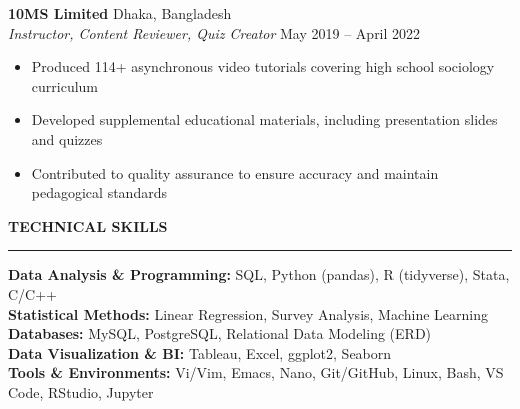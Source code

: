 \documentclass[letterpaper, 11pt]{article}
\begin{document}

    \noindent \textbf{10MS Limited} \hfill Dhaka, Bangladesh \\
    \textit{Instructor, Content Reviewer, Quiz Creator} \hfill May 2019 -- April 2022
    \begin{itemize}[noitemsep, topsep=4pt, itemsep=2pt]
        \item Produced 114+ asynchronous video tutorials covering high school sociology curriculum
        \item Developed supplemental educational materials, including presentation slides and quizzes
        \item Contributed to quality assurance to ensure accuracy and maintain pedagogical standards
    \end{itemize}
    \vspace{0.5em}

    \noindent \textbf{\large TECHNICAL SKILLS}
    \vspace{0.3em}
    \hrule
    \vspace{0.5em}
    \noindent
    \textbf{Data Analysis \& Programming:} SQL, Python (pandas), R (tidyverse), Stata, C/C++\\
    \textbf{Statistical Methods:} Linear Regression, Survey Analysis, Machine Learning\\
    \textbf{Databases:} MySQL, PostgreSQL, Relational Data Modeling (ERD)\\
    \textbf{Data Visualization \& BI:} Tableau, Excel, ggplot2, Seaborn\\
    \textbf{Tools \& Environments:} Vi/Vim, Emacs, Nano, Git/GitHub, Linux, Bash, VS Code, RStudio, Jupyter


    \vspace{0.5em}
\end{document}
